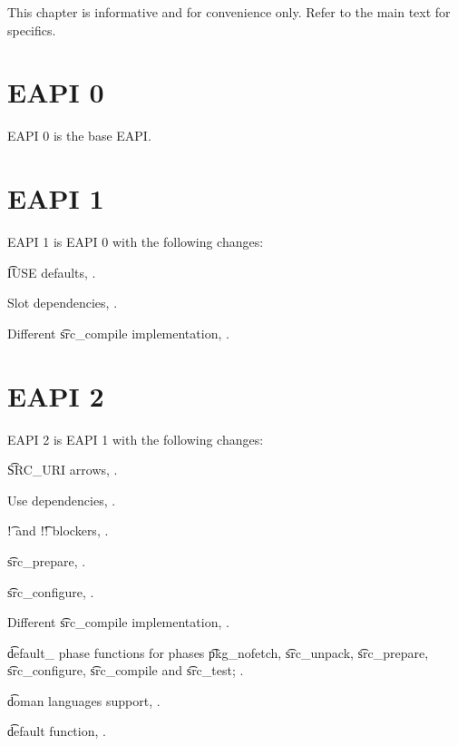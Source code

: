 \note This chapter is informative and for convenience only. Refer to the main text for specifics.

\section*{EAPI 0}

EAPI 0 is the base EAPI.

\section*{EAPI 1}

EAPI 1 is EAPI 0 with the following changes:

\begin{compactitem}
\item \t{IUSE} defaults, .
\item Slot dependencies, .
\item Different \t{src\_compile} implementation, .
\end{compactitem}

\section*{EAPI 2}

EAPI 2 is EAPI 1 with the following changes:

\begin{compactitem}
\item \t{SRC\_URI} arrows, .
\item Use dependencies, .
\item \t{!} and \t{!!} blockers, .
\item \t{src\_prepare}, .
\item \t{src\_configure}, .
\item Different \t{src\_compile} implementation, .
\item \t{default\_} phase functions for phases \t{pkg\_nofetch}, \t{src\_unpack}, \t{src\_prepare},
    \t{src\_configure}, \t{src\_compile} and \t{src\_test}; .
\item \t{doman} languages support, .
\item \t{default} function, .
\end{compactitem}

